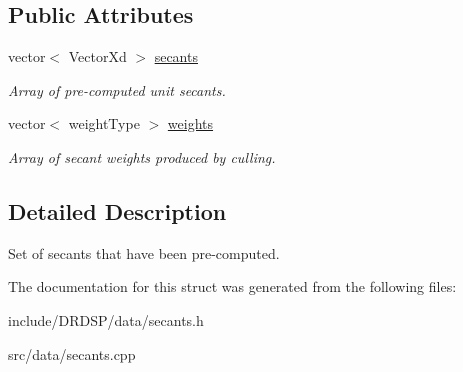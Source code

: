 \subsection*{Public Attributes}
\begin{DoxyCompactItemize}
\item 
\hypertarget{struct_d_r_d_s_p_1_1_secants_pre_computed_ad343c78cb0caa31f6038f2335f495060}{vector$<$ Vector\-Xd $>$ \hyperlink{struct_d_r_d_s_p_1_1_secants_pre_computed_ad343c78cb0caa31f6038f2335f495060}{secants}}\label{struct_d_r_d_s_p_1_1_secants_pre_computed_ad343c78cb0caa31f6038f2335f495060}

\begin{DoxyCompactList}\small\item\em Array of pre-\/computed unit secants. \end{DoxyCompactList}\item 
\hypertarget{struct_d_r_d_s_p_1_1_secants_pre_computed_a045ef571dca40428921fec48c463167a}{vector$<$ weight\-Type $>$ \hyperlink{struct_d_r_d_s_p_1_1_secants_pre_computed_a045ef571dca40428921fec48c463167a}{weights}}\label{struct_d_r_d_s_p_1_1_secants_pre_computed_a045ef571dca40428921fec48c463167a}

\begin{DoxyCompactList}\small\item\em Array of secant weights produced by culling. \end{DoxyCompactList}\end{DoxyCompactItemize}


\subsection{Detailed Description}
Set of secants that have been pre-\/computed. 

The documentation for this struct was generated from the following files\-:\begin{DoxyCompactItemize}
\item 
include/\-D\-R\-D\-S\-P/data/secants.\-h\item 
src/data/secants.\-cpp\end{DoxyCompactItemize}
